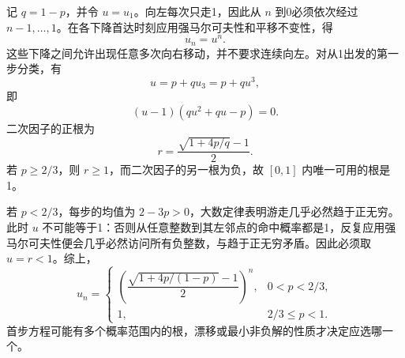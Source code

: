 记 $q=1-p$，并令 $u=u_1$。向左每次只走1，因此从 $n$ 到0必须依次经过 $n-1,\ldots,1$。在各下降首达时刻应用强马尔可夫性和平移不变性，得
\[
 u_n=u^n.
\]
这些下降之间允许出现任意多次向右移动，并不要求连续向左。对从1出发的第一步分类，有
\[
 u=p+qu_3=p+qu^3,
\]
即
\[
 (u-1)(qu^2+qu-p)=0.
\]
二次因子的正根为
\[
 r=\frac{\sqrt{1+4p/q}-1}{2}.
\]
若 $p\ge2/3$，则 $r\ge1$，而二次因子的另一根为负，故 $[0,1]$ 内唯一可用的根是1。

若 $p<2/3$，每步的均值为 $2-3p>0$，大数定律表明游走几乎必然趋于正无穷。此时 $u$ 不可能等于1：否则从任意整数到其左邻点的命中概率都是1，反复应用强马尔可夫性便会几乎必然访问所有负整数，与趋于正无穷矛盾。因此必须取 $u=r<1$。综上，
\[
 \boxed{u_n=
 \begin{cases}
 \left(\dfrac{\sqrt{1+4p/(1-p)}-1}{2}\right)^n,
       &0<p<2/3,\\[4pt]
 1,&2/3\le p<1.
 \end{cases}}
\]
首步方程可能有多个概率范围内的根，漂移或最小非负解的性质才决定应选哪一个。
